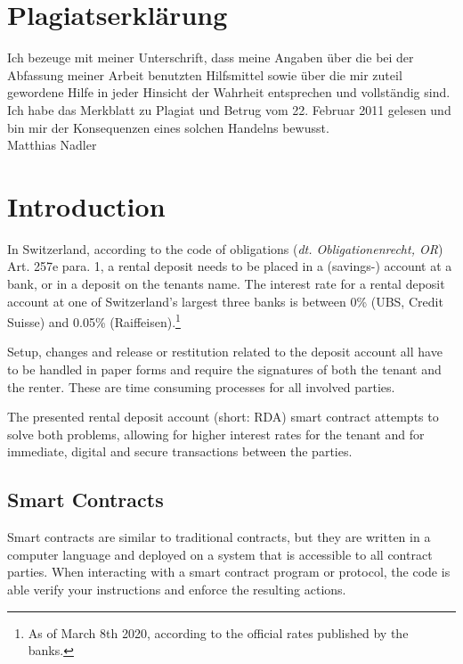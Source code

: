 \documentclass[12pt,a4paper,titlepage,oneside,english]{article}
\begin{document}
\section*{Plagiatserklärung}
Ich bezeuge mit meiner Unterschrift, dass meine Angaben über die bei der Abfassung meiner Arbeit benutzten Hilfsmittel sowie über die mir zuteil gewordene Hilfe in jeder Hinsicht der Wahrheit entsprechen und vollständig sind. Ich habe das Merkblatt zu Plagiat und Betrug vom 22. Februar 2011 gelesen und bin mir der Konsequenzen eines solchen Handelns bewusst.\\

Matthias Nadler

\newpage
\onehalfspacing
{}



\section{Introduction}
\label{sec:introduction}
In Switzerland, according to the code of obligations (\textit{dt. Obligationenrecht, OR})  Art. 257e para. 1, a rental deposit needs to be placed in a (savings-) account at a bank, or in a deposit on the tenants name. The interest rate for a rental deposit account at one of Switzerland's largest three banks is between 0\% (UBS, Credit Suisse) and 0.05\% (Raiffeisen).\footnote{As of March 8th 2020, according to the official rates published by the banks.}

Setup, changes and release or restitution related to the deposit account all have to be handled in paper forms and require the signatures of both the tenant and the renter. These are time consuming processes for all involved parties.

The presented rental deposit account (short: RDA) smart contract attempts to solve both problems, allowing for higher interest rates for the tenant and for immediate, digital and secure transactions between the parties. 

\subsection{Smart Contracts}
\label{sub:smart-contracts}
Smart contracts are similar to traditional contracts, but they are written in a computer language and deployed on a system that is accessible to all contract parties. When interacting with a smart contract program or protocol, the code is able verify your instructions and enforce the resulting actions.
\end{document}
